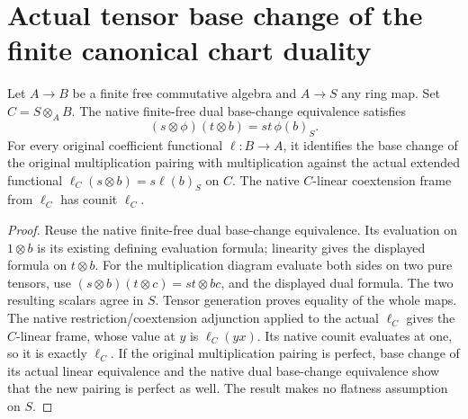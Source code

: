 \section{Actual tensor base change of the finite canonical chart duality}
\label{sec:kn-nadel-kummer-canonical-base-change}

\begin{lemma}
\label{lem:kn-nadel-finite-dual-base-change-diagram}
\leanok
Let $A\to B$ be a finite free commutative algebra and $A\to S$ any
ring map.  Set $C=S\otimes_A B$.  The native finite-free dual
base-change equivalence satisfies
\[
 (s\otimes\phi)(t\otimes b)=st\,\phi(b)_S.
\]
For every original coefficient functional $\ell:B\to A$, it
identifies the base change of the original multiplication pairing
with multiplication against the actual extended functional
$\ell_C(s\otimes b)=s\ell(b)_S$ on $C$.  The native
$C$-linear coextension frame from $\ell_C$ has counit $\ell_C$.
\end{lemma}
\begin{proof}
Reuse the native finite-free dual base-change equivalence.  Its
evaluation on $1\otimes b$ is its existing defining evaluation
formula; linearity gives the displayed formula on $t\otimes b$.
For the multiplication diagram evaluate both sides on two pure
tensors, use $(s\otimes b)(t\otimes c)=st\otimes bc$, and the
displayed dual formula.  The two resulting scalars agree in $S$.
Tensor generation proves equality of the whole maps.  The native
restriction/coextension adjunction applied to the actual $\ell_C$
gives the $C$-linear frame, whose value at $y$ is $\ell_C(yx)$.
Its native counit evaluates at one, so it is exactly $\ell_C$.
If the original multiplication pairing is perfect, base change
of its actual linear equivalence and the native dual base-change
equivalence show that the new pairing is perfect as well.  The
result makes no flatness assumption on $S$.
\end{proof}

